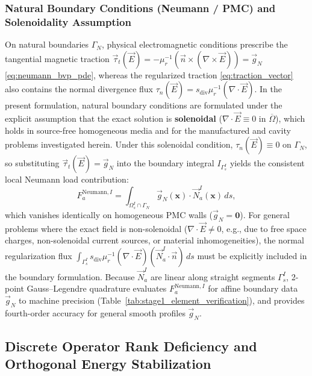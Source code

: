 \documentclass[VANCOUVER]{USG}
\begin{document}
\subsubsection{Natural Boundary Conditions (Neumann / PMC) and Solenoidality Assumption}
\label{subsubsec:neumann_divergence_treatment}

On natural boundaries $\Gamma_N$, physical electromagnetic conditions prescribe the tangential magnetic traction $\vec{\tau}_t(\vec{E}) = -\mu_r^{-1}(\vec{n} \times (\nabla \times \vec{E})) = \vec{g}_N$ \eqref{eq:neumann_bvp_pde}, whereas the regularized traction \eqref{eq:traction_vector} also contains the normal divergence flux $\tau_n(\vec{E}) = s_{\mathrm{div}}\mu_r^{-1}(\nabla \cdot \vec{E})$.
In the present formulation, natural boundary conditions are formulated under the explicit assumption that the exact solution is \textbf{solenoidal} ($\nabla \cdot \vec{E} \equiv 0$ in $\overline{\Omega}$), which holds in source-free homogeneous media and for the manufactured and cavity problems investigated herein. Under this solenoidal condition, $\tau_n(\vec{E}) \equiv 0$ on $\Gamma_N$, so substituting $\vec{\tau}_t(\vec{E}) = \vec{g}_N$ into the boundary integral $I_{\Gamma_s^I}$ yields the consistent local Neumann load contribution:
\begin{equation}
    F_a^{\mathrm{Neumann}, I} = \int_{\Omega_s^I \cap \Gamma_N} \vec{g}_N(\mathbf{x}) \cdot \vec{N}_a^I(\mathbf{x}) \, ds,
    \label{eq:neumann_load_integral}
\end{equation}
which vanishes identically on homogeneous PMC walls ($\vec{g}_N = \mathbf{0}$). For general problems where the exact field is non-solenoidal ($\nabla \cdot \vec{E} \ne 0$, e.g., due to free space charges, non-solenoidal current sources, or material inhomogeneities), the normal regularization flux $\int_{\Gamma_s^I} s_{\mathrm{div}}\mu_r^{-1}(\nabla \cdot \vec{E})(\vec{N}_a^I \cdot \vec{n})\,ds$ must be explicitly included in the boundary formulation.
Because $\vec{N}_a^I$ are linear along straight segments $\Gamma_s^I$, 2-point Gauss--Legendre quadrature evaluates $F_a^{\mathrm{Neumann}, I}$ for affine boundary data $\vec{g}_N$ to machine precision (Table~\ref{tab:stage1_element_verification}), and provides fourth-order accuracy for general smooth profiles $\vec{g}_N$.

\subsection{Discrete Operator Rank Deficiency and Orthogonal Energy Stabilization}
\label{subsec:rank_deficiency_stabilization}
\end{document}
